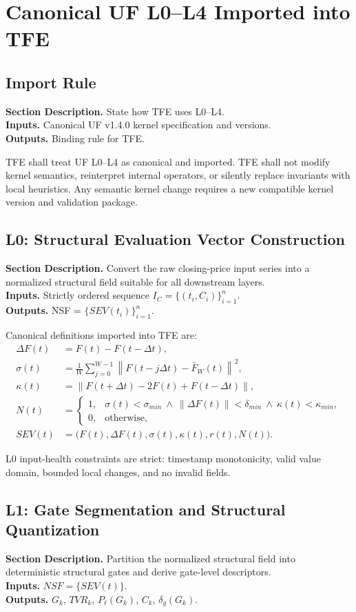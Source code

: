\documentclass[11pt]{report}
\newcommand{\meta}[3]{\textbf{Section Description.} #1\\
\textbf{Inputs.} #2\\
\textbf{Outputs.} #3\par}
\begin{document}
\chapter{Canonical UF L0--L4 Imported into TFE}
\section{Import Rule}
\meta{State how TFE uses L0--L4.}{Canonical UF v1.4.0 kernel specification and versions.}{Binding rule for TFE.}

TFE shall treat UF L0--L4 as canonical and imported. TFE shall not modify kernel semantics, reinterpret internal operators, or silently replace invariants with local heuristics. Any semantic kernel change requires a new compatible kernel version and validation package.

\section{L0: Structural Evaluation Vector Construction}
\meta{Convert the raw closing-price input series into a normalized structural field suitable for all downstream layers.}{Strictly ordered sequence $I_C=\{(t_i,C_i)\}_{i=1}^{n}$.}{NSF = $\{SEV(t_i)\}_{i=1}^{n}$.}

Canonical definitions imported into TFE are:
\begin{align*}
\Delta F(t) &= F(t)-F(t-\Delta t),\\
\sigma(t) &= \frac{1}{W}\sum_{j=0}^{W-1}\left\lVert F(t-j\Delta t)-\bar F_W(t)\right\rVert^2,\\
\kappa(t) &= \left\lVert F(t+\Delta t)-2F(t)+F(t-\Delta t)\right\rVert,\\
N(t) &= \begin{cases}
1, & \sigma(t)<\sigma_{min}\ \wedge\ \lVert\Delta F(t)\rVert<\delta_{min}\ \wedge\ \kappa(t)<\kappa_{min},\\
0, & \text{otherwise,}
\end{cases}\\
SEV(t) &= \big(F(t),\Delta F(t),\sigma(t),\kappa(t),r(t),N(t)\big).
\end{align*}

L0 input-health constraints are strict: timestamp monotonicity, valid value domain, bounded local changes, and no invalid fields.

\section{L1: Gate Segmentation and Structural Quantization}
\meta{Partition the normalized structural field into deterministic structural gates and derive gate-level descriptors.}{$NSF=\{SEV(t)\}$.}{$G_k$, $TVR_k$, $P_\ell(G_k)$, $C_k$, $\delta_g(G_k)$.}
\end{document}
